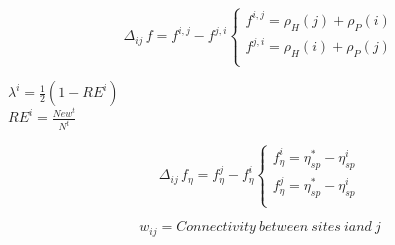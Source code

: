 \vspace{0.5cm}
$$
\Delta_{ij}\,f = f^{i,j} - f^{j,i}\left\{ \begin{array}{rl}
 f^{i,j} = \rho_{H}(j) + \rho_{P}(i) \\
 f^{j,i} = \rho_{H}(i) + \rho_{P}(j) \\
       \end{array} \right.
$$

\vspace{0.5cm}
\centering $\lambda^{i} = \frac{1}{2} \left( 1 - RE^{i} \right)$ \\

\vspace{0.25cm}
\centering $ RE^{i} = \frac{ New^{t} }{ N^{t} }$

\vspace{0.25cm}
$$
 \Delta_{ij}\,f_{\eta} = f_{\eta}^{j} - f_{\eta}^{i} \left\{ \begin{array}{rl}
 f_{\eta}^{i} = \eta_{sp}^{*} - \eta_{sp}^{i} \\
 f_{\eta}^{j} = \eta_{sp}^{*} - \eta_{sp}^{i} \\
       \end{array} \right.
$$

\vspace{0.25cm}
$$w_{ij} = Connectivity \: between \: sites \: i and \: j$$


\vspace{1cm}

